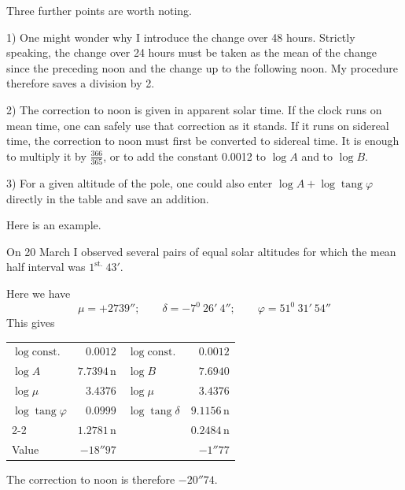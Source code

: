 Three further points are worth noting.

1) One might wonder why I introduce the change over 48 hours. Strictly speaking, the change over 24 hours must be taken as the mean of the change since the preceding noon and the change up to the following noon. My procedure therefore saves a division by 2.

2) The correction to noon is given in apparent solar time. If the clock runs on mean time, one can safely use that correction as it stands. If it runs on sidereal time, the correction to noon must first be converted to sidereal time. It is enough to multiply it by $\frac{366}{365}$, or to add the constant 0.0012 to $\log A$ and to $\log B$.

3) For a given altitude of the pole, one could also enter $\log A+\log\operatorname{tang}\varphi$ directly in the table and save an addition.

Here is an example.

On 20 March I observed several pairs of equal solar altitudes for which the mean half interval was $1^{\mathrm{st.}}\ 43'$.
%

Here we have
\[
\mu=+2739'';\qquad\delta=-7^0\ 26'\ 4'';\qquad\varphi=51^0\ 31'\ 54''
\]
This gives
\begin{center}
\begin{tabular}{lr@{\qquad\qquad}lr}
$\log\mathrm{const.}$ & $0.0012$ & $\log\mathrm{const.}$ & $0.0012$\\
$\log A$ & $7.7394\,\mathrm n$ & $\log B$ & $7.6940$\\
$\log\mu$ & $3.4376$ & $\log\mu$ & $3.4376$\\
$\log\operatorname{tang}\varphi$ & $0.0999$ & $\log\operatorname{tang}\delta$ & $9.1156\,\mathrm n$\\\cline{2-2}\cline{4-4}
& $1.2781\,\mathrm n$ & & $0.2484\,\mathrm n$\\
Value & $-18''97$ & & $-1''77$\\
\end{tabular}
\end{center}
The correction to noon is therefore $-20''74$.

